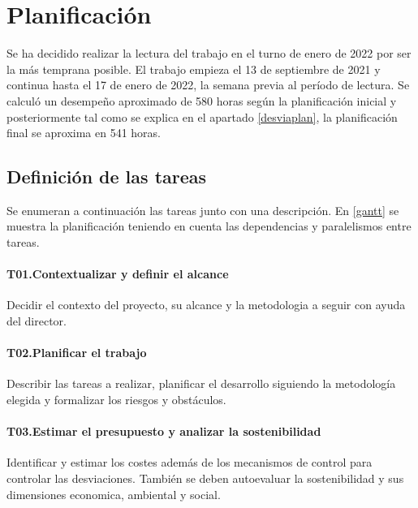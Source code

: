 
\chapter{Planificación}\label{desctasks}
Se ha decidido realizar la lectura del trabajo en el turno de enero de 2022 por ser la más
temprana posible. El trabajo empieza el 13 de septiembre
de 2021 y continua hasta el 17 de enero de 2022, la semana previa al período de lectura.
Se calculó un desempeño aproximado de 580 horas según la planificación inicial y posteriormente tal como se
explica en el apartado \ref{desviaplan}, la planificación final se aproxima en 541 horas.

\section{Definición de las tareas}
Se enumeran a continuación las tareas junto con una descripción. En \ref{gantt} se muestra la planificación teniendo
en cuenta las dependencias y paralelismos entre tareas.
\subsubsection{T01.\quad Contextualizar y definir el alcance}\label{T01}
Decidir el contexto del proyecto, su alcance y la metodologia a seguir con ayuda
del director.
\subsubsection{T02.\quad Planificar el trabajo}\label{T02}
Describir las tareas a realizar, planificar el desarrollo siguiendo la
metodología elegida y formalizar los riesgos y obstáculos.
\subsubsection{T03.\quad Estimar el presupuesto y analizar la sostenibilidad}\label{T03}
Identificar y estimar los costes además de los mecanismos de control para controlar las
desviaciones. También se deben autoevaluar la sostenibilidad y sus dimensiones economica,
ambiental y social.
